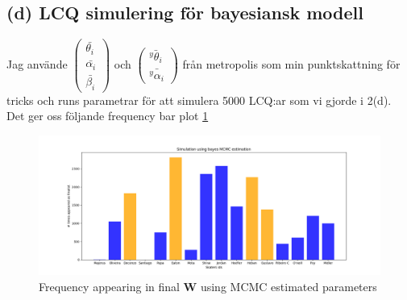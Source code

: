 \documentclass{assignment}
\begin{document}
\subsection*{(d) LCQ simulering för bayesiansk modell}
Jag använde $\begin{pmatrix} \bar{\theta_i} \\ \bar{\alpha_i} \\ \bar{\beta_i} \end{pmatrix}$ och
$\begin{pmatrix} \bar{^y\theta_i} \\ \bar{^y\alpha_i}\end{pmatrix}$ 
från metropolis som min punktskattning för tricks och runs parametrar för att simulera 5000 LCQ:ar som vi 
gjorde i 2(d).
Det ger oss följande frequency bar plot \cref{MCMC freq bar} 
\begin{figure}
    \includegraphics[width=200mm]{assets/MCMCsim.png}
    \caption{Frequency appearing in final \textbf{W} using MCMC estimated parameters}
    \label{MCMC freq bar}
\end{figure}
\end{document}
